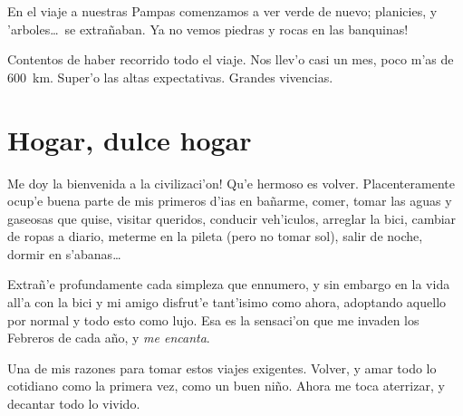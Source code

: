 En el viaje a nuestras Pampas comenzamos a ver verde de nuevo; planicies, y
'arboles\ldots\ se extra\~naban. \textexclamdown Ya no vemos piedras y rocas en
las banquinas!

Contentos de haber recorrido todo el viaje. Nos llev'o casi un mes, poco m'as de
600~km. Super'o las altas expectativas. Grandes vivencias.

\section{Hogar, dulce hogar}

\textexclamdown Me doy la bienvenida a la civilizaci'on! Qu'e hermoso es volver.
Placenteramente ocup'e buena parte de mis primeros d'ias en ba\~narme, comer,
tomar las aguas y gaseosas que quise, visitar queridos, conducir veh'iculos,
arreglar la bici, cambiar de ropas a diario, meterme en la pileta (pero no tomar
sol), salir de noche, dormir en s'abanas\ldots\

Extra\~n'e profundamente cada simpleza que ennumero, y sin embargo en la vida
all'a con la bici y mi amigo disfrut'e tant'isimo como ahora, adoptando aquello
por normal y todo esto como lujo. Esa es la sensaci'on que me invaden los
Febreros de cada a\~no, y \emph{me encanta}.

Una de mis razones para tomar estos viajes exigentes. Volver, y amar todo lo
cotidiano como la primera vez, como un buen ni\~no. Ahora me toca aterrizar, y
decantar todo lo vivido.

\newpage
\thispagestyle{empty}